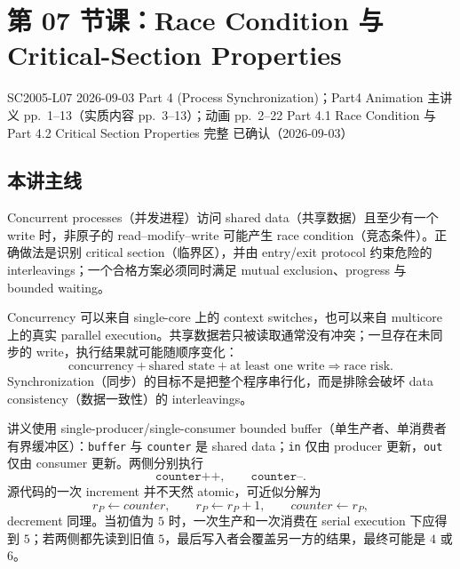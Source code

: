 
\section{第 07 节课：Race Condition 与 Critical-Section Properties}
\label{lecture:SC2005-L07}

\lecturemeta
  {SC2005-L07}
  {2026-09-03}
  {Part 4 (Process Synchronization)；Part4 Animation}
  {主讲义 pp.~1--13（实质内容 pp.~3--13）；动画 pp.~2--22}
  {Part 4.1 Race Condition 与 Part 4.2 Critical Section Properties 完整}
  {已确认（2026-09-03）}

\subsection{本讲主线}

Concurrent processes（并发进程）访问 shared data（共享数据）且至少有一个 write 时，非原子的 read--modify--write 可能产生 race condition（竞态条件）。正确做法是识别 critical section（临界区），并由 entry/exit protocol 约束危险的 interleavings；一个合格方案必须同时满足 mutual exclusion、progress 与 bounded waiting。



Concurrency 可以来自 single-core 上的 context switches，也可以来自 multicore 上的真实 parallel execution。共享数据若只被读取通常没有冲突；一旦存在未同步的 write，执行结果就可能随顺序变化：
\[
  \boxed{\text{concurrency}+\text{shared state}+\text{at least one write}
  \Longrightarrow\text{race risk}.}
\]
Synchronization（同步）的目标不是把整个程序串行化，而是排除会破坏 data consistency（数据一致性）的 interleavings。


讲义使用 single-producer/single-consumer bounded buffer（单生产者、单消费者有界缓冲区）：\texttt{buffer} 与 \texttt{counter} 是 shared data；\texttt{in} 仅由 producer 更新，\texttt{out} 仅由 consumer 更新。两侧分别执行
\[
  \texttt{counter++},\qquad \texttt{counter--}.
\]
源代码的一次 increment 并不天然 atomic，可近似分解为
\[
  r_P\gets counter,\qquad r_P\gets r_P+1,\qquad counter\gets r_P,
\]
decrement 同理。当初值为 $5$ 时，一次生产和一次消费在 serial execution 下应得到 $5$；若两侧都先读到旧值 $5$，最后写入者会覆盖另一方的结果，最终可能是 $4$ 或 $6$。

